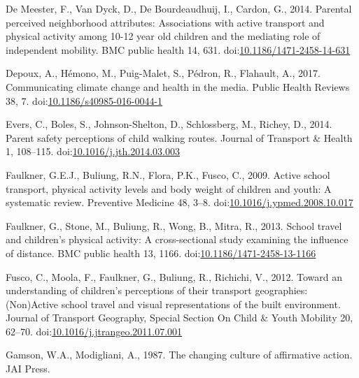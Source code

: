 \documentclass[]{elsarticle} %
\begin{document}
\leavevmode\hypertarget{ref-demeesterParentalPerceivedNeighborhood2014}{}%
De Meester, F., Van Dyck, D., De Bourdeaudhuij, I., Cardon, G., 2014.
Parental perceived neighborhood attributes: Associations with active
transport and physical activity among 10-12 year old children and the
mediating role of independent mobility. BMC public health 14, 631.
doi:\href{https://doi.org/10.1186/1471-2458-14-631}{10.1186/1471-2458-14-631}

\leavevmode\hypertarget{ref-depouxCommunicatingClimateChange2017}{}%
Depoux, A., Hémono, M., Puig-Malet, S., Pédron, R., Flahault, A., 2017.
Communicating climate change and health in the media. Public Health
Reviews 38, 7.
doi:\href{https://doi.org/10.1186/s40985-016-0044-1}{10.1186/s40985-016-0044-1}

\leavevmode\hypertarget{ref-eversParentSafetyPerceptions2014}{}%
Evers, C., Boles, S., Johnson-Shelton, D., Schlossberg, M., Richey, D.,
2014. Parent safety perceptions of child walking routes. Journal of
Transport \& Health 1, 108--115.
doi:\href{https://doi.org/10.1016/j.jth.2014.03.003}{10.1016/j.jth.2014.03.003}

\leavevmode\hypertarget{ref-faulknerActiveSchoolTransport2009}{}%
Faulkner, G.E.J., Buliung, R.N., Flora, P.K., Fusco, C., 2009. Active
school transport, physical activity levels and body weight of children
and youth: A systematic review. Preventive Medicine 48, 3--8.
doi:\href{https://doi.org/10.1016/j.ypmed.2008.10.017}{10.1016/j.ypmed.2008.10.017}

\leavevmode\hypertarget{ref-faulknerSchoolTravelChildren2013}{}%
Faulkner, G., Stone, M., Buliung, R., Wong, B., Mitra, R., 2013. School
travel and children's physical activity: A cross-sectional study
examining the influence of distance. BMC public health 13, 1166.
doi:\href{https://doi.org/10.1186/1471-2458-13-1166}{10.1186/1471-2458-13-1166}

\leavevmode\hypertarget{ref-fuscoUnderstandingChildrenPerceptions2012}{}%
Fusco, C., Moola, F., Faulkner, G., Buliung, R., Richichi, V., 2012.
Toward an understanding of children's perceptions of their transport
geographies: (Non)Active school travel and visual representations of the
built environment. Journal of Transport Geography, Special Section On
Child \& Youth Mobility 20, 62--70.
doi:\href{https://doi.org/10.1016/j.jtrangeo.2011.07.001}{10.1016/j.jtrangeo.2011.07.001}

\leavevmode\hypertarget{ref-gamsonChangingCulture1987}{}%
Gamson, W.A., Modigliani, A., 1987. The changing culture of affirmative
action. JAI Press.
\end{document}
